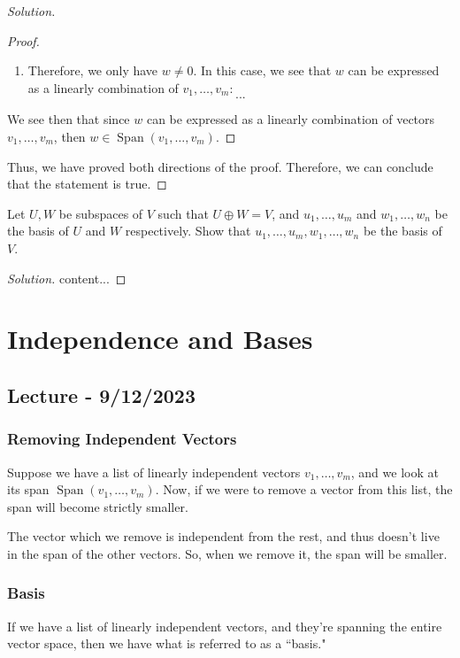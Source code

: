 \documentclass[openany]{book}
\newenvironment{solution}{\begin{proof}[Solution]}{\end{proof}}
\DeclareMathOperator*{\Span}{Span}
\begin{document}
\begin{solution}
\begin{proof}
\begin{enumerate}
	 		\item Therefore, we only have $w \not= 0$. In this case, we see that $w$ can be expressed as a linearly combination of $v_{1}, \ldots, v_{m}$:
	 		\begin{equation*}
	 			...
	 		\end{equation*}
	 	\end{enumerate} 
	 	
	 	We see then that since $w$ can be expressed as a linearly combination of vectors $v_{1}, \ldots, v_{m}$, then $w \in \Span(v_{1}, \ldots, v_{m})$.
	\end{proof}

	Thus, we have proved both directions of the proof. Therefore, we can conclude that the statement is true.
\end{solution}

\begin{hw}
	Let $U, W$ be subspaces of $V$ such that $U \oplus W = V$, and $u_{1}, \ldots, u_{m}$ and $w_{1}, \ldots, w_{n}$ be the basis of $U$ and $W$ respectively. Show that $u_{1}, \ldots, u_{m}, w_{1}, \ldots, w_{n}$ be the basis of $V$.
\end{hw}
\begin{solution}
	content...
\end{solution}

\chapter{Independence and Bases}
\section{Lecture - 9/12/2023}
\subsection{Removing Independent Vectors}
Suppose we have a list of linearly independent vectors $v_{1}, \ldots, v_{m}$, and we look at its span $\Span(v_{1}, \ldots, v_{m})$. Now, if we were to remove a vector from this list, the span will become strictly smaller.

The vector which we remove is independent from the rest, and thus doesn't live in the span of the other vectors. So, when we remove it, the span will be smaller.

\subsection{Basis}
	\begin{defn}[Basis]
		If we have a list of linearly independent vectors, and they're spanning the entire vector space, then we have what is referred to as a ``basis."
	\end{defn}
\end{document}
